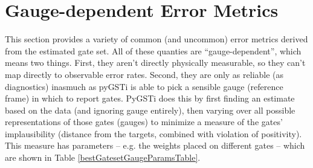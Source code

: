 \documentclass{article}[11pt]
\begin{document}
{\section{Gauge-dependent Error Metrics}
This section provides a variety of common (and uncommon) error metrics derived from the estimated gate set.  All of these quanties are ``gauge-dependent'', which means two things.  First, they aren't directly physically measurable, so they can't map directly to observable error rates.  Second, they are only as reliable (as diagnostics) inasmuch as pyGSTi is able to pick a sensible gauge (reference frame) in which to report gates.  PyGSTi does this by first finding an estimate based on the data (and ignoring gauge entirely), then varying over all possible representations of those gates (gauges) to minimize a measure of the gates' implausibility (distance from the targets, combined with violation of positivity).  This measure has parameters -- e.g. the weights placed on different gates -- which are shown in Table \ref{bestGatesetGaugeParamsTable}.

}
\end{document}

